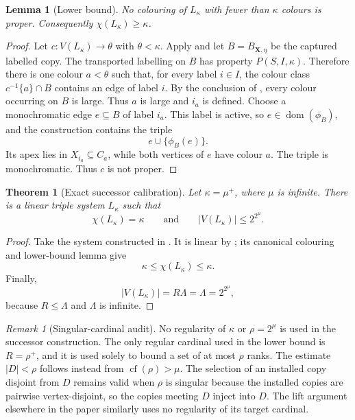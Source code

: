 \documentclass[11pt]{amsart}
\newtheorem{theorem}{Theorem}[section]
\newtheorem{lemma}[lemma]{Lemma}
\theoremstyle{definition}
\theoremstyle{remark}
\newtheorem{remark}[remark]{Remark}
\numberwithin{equation}{section}
\DeclareMathOperator{\cf}{cf}
\DeclareMathOperator{\dom}{dom}
\begin{document}
\begin{lemma}[Lower bound]
\label{lem:calibration-lower}
No colouring of $L_\kappa$ with fewer than $\kappa$ colours is proper.
Consequently $\chi(L_\kappa)\ge\kappa$.
\end{lemma}

\begin{proof}
Let $c:V(L_\kappa)\to\theta$ with $\theta<\kappa$.  Apply
 and let $B=B_{\mathbf X,\eta}$ be the
captured labelled copy.  The transported labelling on $B$ has property
$P(S,I,\kappa)$.  Therefore there is one colour $a<\theta$ such that, for
every label $i\in I$, the colour class $c^{-1}\{a\}\cap B$ contains an
edge of label $i$.  By the conclusion of
, every colour occurring on $B$ is large.
Thus $a$ is large and $i_a$ is defined.  Choose a monochromatic
edge $e\subseteq B$ of label $i_a$.  This label is active, so
$e\in\dom(\phi_B)$, and the construction contains the triple
\[
 e\cup\{\phi_B(e)\}.
\]
Its apex lies in $X_{i_a}\subseteq C_a$, while both vertices of $e$ have
colour $a$.  The triple is monochromatic.  Thus $c$ is not proper.
\end{proof}

\begin{theorem}[Exact successor calibration]
\label{thm:successor-linear}
Let $\kappa=\mu^+$, where $\mu$ is infinite.  There is a linear triple
system $L_\kappa$ such that
\[
 \chi(L_\kappa)=\kappa
 \qquad\text{and}\qquad
 |V(L_\kappa)|\le 2^{2^\mu}.
\]
\end{theorem}

\begin{proof}
Take the system constructed in .
It is linear by ; its canonical colouring
and lower-bound lemma give
\[
 \kappa\le\chi(L_\kappa)\le\kappa.
\]
Finally,
\[
 |V(L_\kappa)|=R\Lambda=\Lambda=2^{2^\mu},
\]
because $R\le\Lambda$ and $\Lambda$ is infinite.
\end{proof}

\begin{remark}[Singular-cardinal audit]
\label{rem:singular-audit}
No regularity of $\kappa$ or $\rho=2^\mu$ is used in the successor
construction.  The only regular cardinal used in the lower bound is
$R=\rho^+$, and it is used solely to bound a set of at most $\rho$ ranks.
The estimate $|D|<\rho$ follows instead from
$\cf(\rho)>\mu$.  The selection of an installed copy disjoint from $D$
remains valid when $\rho$ is singular because the installed copies are
pairwise vertex-disjoint, so the copies meeting $D$ inject into $D$.
The lift argument elsewhere in the paper similarly uses no regularity of
its target cardinal.
\end{remark}
\end{document}
